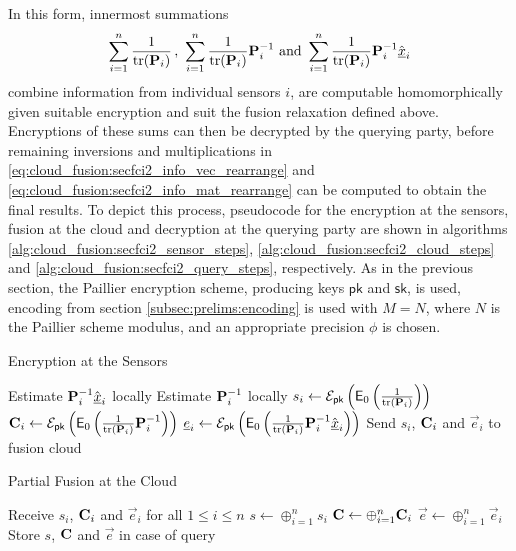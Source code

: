 In this form, innermost summations  
\begin{equation}
    \sum_{i=1}^n \frac{1}{\tr(\mat{P}_i)}\,,\ \sum_{i=1}^n \frac{1}{\tr(\mat{P}_i)}\mat{P}_i^{-1}\text{ and }\sum_{i=1}^n\frac{1}{\tr(\mat{P}_i)}\mat{P}_i^{-1}\hat{\vec{x}}_i
\end{equation}
combine information from individual sensors $i$, are computable homomorphically given suitable encryption and suit the fusion relaxation defined above. Encryptions of these sums can then be decrypted by the querying party, before remaining inversions and multiplications in \eqref{eq:cloud_fusion:secfci2_info_vec_rearrange} and \eqref{eq:cloud_fusion:secfci2_info_mat_rearrange} can be computed to obtain the final results. To depict this process, pseudocode for the encryption at the sensors, fusion at the cloud and decryption at the querying party are shown in algorithms \ref{alg:cloud_fusion:secfci2_sensor_steps}, \ref{alg:cloud_fusion:secfci2_cloud_steps} and \ref{alg:cloud_fusion:secfci2_query_steps}, respectively. As in the previous section, the Paillier encryption scheme, producing keys $\mathsf{pk}$ and $\mathsf{sk}$, is used, encoding from section \ref{subsec:prelims:encoding} is used with $M=N$, where $N$ is the Paillier scheme modulus, and an appropriate precision $\phi$ is chosen.
\begin{algorithm}[htbp]
\caption{Encryption at the Sensors}\label{alg:cloud_fusion:secfci2_sensor_steps}
\begin{algorithmic}[1]
    \State Estimate ${{\mathbf{P}}}_i^{-1}\hat{{\underline{x}}}_i$ locally
    \State Estimate ${{\mathbf{P}}}_i^{-1}$ locally
    \State $s_i \gets \mathcal{E}_{\mathsf{pk}}\left(\mathsf{E}_{0}\left(\frac{1}{\operatorname{tr}({{\mathbf{P}}}_i)}\right)\right)$
    \State ${{\mathbf{C}}}_i \gets \mathcal{E}_{\mathsf{pk}}\left(\mathsf{E}_{0}\left(\frac{1}{\operatorname{tr}({{\mathbf{P}}}_i)}{{\mathbf{P}}}_i^{-1}\right)\right)$
    \State ${\underline{e}}_i \gets \mathcal{E}_{\mathsf{pk}}\left(\mathsf{E}_{0}\left(\frac{1}{\operatorname{tr}({{\mathbf{P}}}_i)}{{\mathbf{P}}}_i^{-1}\hat{{\underline{x}}}_i\right)\right)$
    \State Send $s_i$, ${{\mathbf{C}}}_i$ and $\vec{e}_i$ to fusion cloud
    \EndProcedure
\end{algorithmic}
\end{algorithm}
\begin{algorithm}[htbp]
\caption{Partial Fusion at the Cloud}\label{alg:cloud_fusion:secfci2_cloud_steps}
\begin{algorithmic}[1]
    \State Receive $s_i$, ${{\mathbf{C}}}_i$ and $\vec{e}_i$ for all $1\leq i \leq n$
    \State $s \gets \oplus_{i=1}^{n} s_i$
    \State ${{\mathbf{C}}} \gets \oplus_{i=1}^{n} {{\mathbf{C}}}_i$
    \State $\vec{e} \gets \oplus_{i=1}^{n} \vec{e}_i$
    \State Store $s$, ${{\mathbf{C}}}$ and $\vec{e}$ in case of query
    \EndProcedure
\end{algorithmic}
\end{algorithm}
